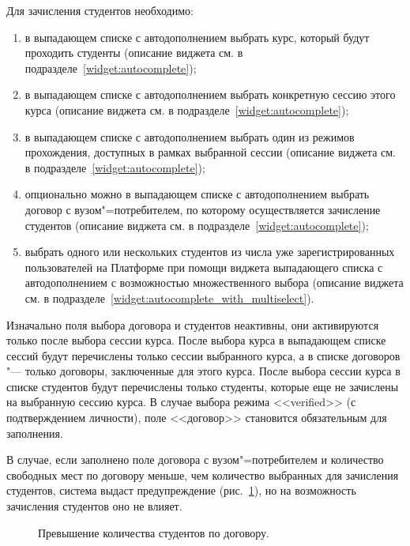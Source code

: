Для зачисления студентов необходимо:
\begin{enumerate}
	\item в выпадающем списке с автодополнением выбрать курс, который будут проходить студенты 
	(описание виджета см. в подразделе~\ref{widget:autocomplete});
	\item в выпадающем списке с автодополнением выбрать конкретную сессию этого курса 
	(описание виджета см. в подразделе~\ref{widget:autocomplete});
	\item в выпадающем списке с автодополнением выбрать один из режимов прохождения, доступных в рамках выбранной сессии 
	(описание виджета см. в подразделе~\ref{widget:autocomplete});
	\item опционально можно в выпадающем списке с автодополнением выбрать договор с вузом"=потребителем, 
	по которому осуществляется зачисление студентов (описание виджета см. в подразделе~\ref{widget:autocomplete});
	\item выбрать одного или нескольких студентов из числа уже зарегистрированных пользователей на Платформе при помощи 
	виджета выпадающего списка с автодополнением с возможностью множественного выбора 
	(описание виджета см. в подразделе~\ref{widget:autocomplete_with_multiselect}). 
\end{enumerate}

Изначально поля выбора договора и студентов неактивны, они активируются только после выбора сессии курса.
После выбора курса в выпадающем списке сессий будут перечислены только сессии выбранного курса, 
а в списке договоров "--- только договоры, заключенные для этого курса.
После выбора сессии курса в списке студентов будут перечислены только студенты, 
которые еще не зачислены на выбранную сессию курса.
В случае выбора режима <<verified>> (с подтверждением личности), поле <<договор>> становится обязательным для заполнения. 


В случае, если заполнено поле договора с вузом"=потребителем и количество свободных мест по договору меньше, 
чем количество выбранных для зачисления студентов, система выдаст предупреждение 
(рис.~\ref{img:student:enroll_student_error}), но на возможность зачисления студентов оно не влияет.

\begin{figure}[H]
	\caption{Превышение количества студентов по договору.}
	\label{img:student:enroll_student_error}
\end{figure}

